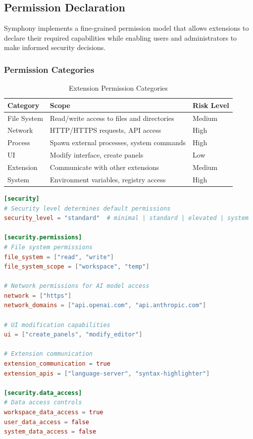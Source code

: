 \subsection{Permission Declaration}
\label{subsec:permission-declaration}

Symphony implements a fine-grained permission model that allows extensions to declare their required capabilities while enabling users and administrators to make informed security decisions.

\subsubsection{Permission Categories}
\label{subsubsec:permission-categories}

\begin{table}[h]
\centering
\caption{Extension Permission Categories}
\label{tab:permission-categories}
\begin{tabular}{@{}lll@{}}
\toprule
\textbf{Category} & \textbf{Scope} & \textbf{Risk Level} \\
\midrule
File System & Read/write access to files and directories & Medium \\
Network & HTTP/HTTPS requests, API access & High \\
Process & Spawn external processes, system commands & High \\
UI & Modify interface, create panels & Low \\
Extension & Communicate with other extensions & Medium \\
System & Environment variables, registry access & High \\
\bottomrule
\end{tabular}
\end{table}

\begin{lstlisting}[language=toml,caption=Permission Declaration Example]
[security]
# Security level determines default permissions
security_level = "standard"  # minimal | standard | elevated | system

[security.permissions]
# File system permissions
file_system = ["read", "write"]
file_system_scope = ["workspace", "temp"]

# Network permissions for AI model access
network = ["https"]
network_domains = ["api.openai.com", "api.anthropic.com"]

# UI modification capabilities
ui = ["create_panels", "modify_editor"]

# Extension communication
extension_communication = true
extension_apis = ["language-server", "syntax-highlighter"]

[security.data_access]
# Data access controls
workspace_data_access = true
user_data_access = false
system_data_access = false
\end{lstlisting}

